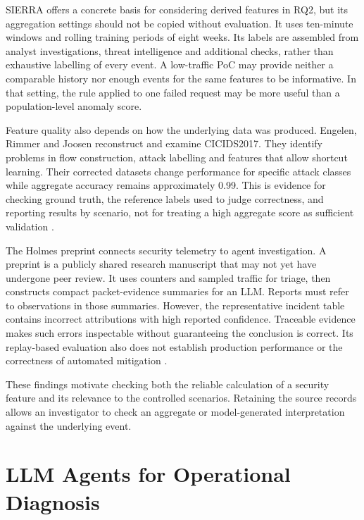 SIERRA offers a concrete basis for considering derived features in RQ2,
but its aggregation settings should not be copied without evaluation. It
uses ten-minute windows and rolling training periods of eight weeks. Its
labels are assembled from analyst investigations, threat intelligence and
additional checks, rather than exhaustive labelling of every event. A
low-traffic PoC may provide neither a comparable history nor enough events
for the same features to be informative. In that setting, the rule applied
to one failed request may be more useful than a population-level anomaly
score.

Feature quality also depends on how the underlying data was produced.
Engelen, Rimmer and Joosen reconstruct and examine CICIDS2017. They identify
problems in flow construction, attack labelling and features that allow
shortcut learning. Their corrected datasets change performance for specific
attack classes while aggregate accuracy remains approximately 0.99. This is
evidence for checking ground truth, the reference labels used to judge
correctness, and reporting results by scenario, not
for treating a high aggregate score as sufficient validation
\parencite[Sections~III--IV]{engelen2021troubleshooting}.

The Holmes preprint connects security telemetry to agent investigation.
A preprint is a publicly shared research manuscript that may not yet have
undergone peer review.
It uses counters and sampled traffic for triage, then constructs compact
packet-evidence summaries for an LLM. Reports must refer to observations in
those summaries. However, the representative incident table contains
incorrect attributions with high reported confidence. Traceable evidence
makes such errors inspectable without guaranteeing the conclusion is
correct. Its replay-based evaluation also does not establish production
performance or the correctness of automated mitigation
\parencite[Sections~3--4, Table~2]{chen2026holmes}.

These findings motivate checking both the reliable calculation of a
security feature and its relevance to the controlled scenarios. Retaining
the source records allows an investigator to check an aggregate or
model-generated interpretation against the underlying event.

\section{LLM Agents for Operational Diagnosis}
\label{sec:state-of-the-art:agents}


